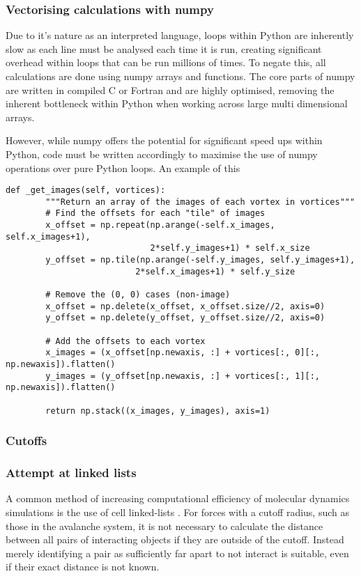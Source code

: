 \documentclass[a4paper, twoside]{article}
\numberwithin{equation}{section}
\begin{document}
\subsubsection{Vectorising calculations with numpy}
Due to it's nature as an interpreted language, loops within Python are inherently slow as each line must be analysed each time it is run, creating significant overhead within loops that can be run millions of times. To negate this, all calculations are done using numpy arrays and functions. The core parts of numpy are written in compiled C or Fortran and are highly optimised, removing the inherent bottleneck within Python when working across large multi dimensional arrays.

However, while numpy offers the potential for significant speed ups within Python, code must be written accordingly to maximise the use of numpy operations over pure Python loops. An example of this 
\begin{verbatim}
def _get_images(self, vortices):
        """Return an array of the images of each vortex in vortices"""
        # Find the offsets for each "tile" of images
        x_offset = np.repeat(np.arange(-self.x_images, self.x_images+1),
                             2*self.y_images+1) * self.x_size
        y_offset = np.tile(np.arange(-self.y_images, self.y_images+1),
                          2*self.x_images+1) * self.y_size
        
        # Remove the (0, 0) cases (non-image)
        x_offset = np.delete(x_offset, x_offset.size//2, axis=0)
        y_offset = np.delete(y_offset, y_offset.size//2, axis=0)
        
        # Add the offsets to each vortex
        x_images = (x_offset[np.newaxis, :] + vortices[:, 0][:, np.newaxis]).flatten()
        y_images = (y_offset[np.newaxis, :] + vortices[:, 1][:, np.newaxis]).flatten()
              
        return np.stack((x_images, y_images), axis=1)
\end{verbatim}

\subsubsection{Cutoffs}
\subsubsection{Attempt at linked lists}
A common method of increasing computational efficiency of molecular dynamics simulations is the use of cell linked-lists \cite{AddRef}. For forces with a cutoff radius, such as those in the avalanche system, it is not necessary to calculate the distance between all pairs of interacting objects if they are outside of the cutoff. Instead merely identifying a pair as sufficiently far apart to not interact is suitable, even if their exact distance is not known.
\end{document}
